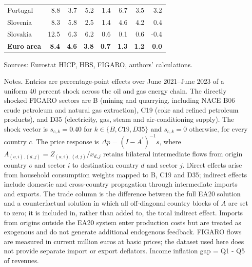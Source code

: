 \documentclass[11pt]{article}
\begin{document}
\begin{table}[H]
\begin{tabular}{lrrrrrrr}
Portugal & 8.8 & 3.7 & 5.2 & 1.4 & 6.7 & 3.5 & 3.2
 \\
Slovenia & 8.3 & 5.8 & 2.5 & 1.4 & 4.6 & 4.2 & 0.4
 \\
Slovakia & 12.5 & 6.3 & 6.2 & 0.6 & 0.1 & 0.6 & -0.4
 \\
\midrule
\textbf{Euro area} & \textbf{8.4} & \textbf{4.6} & \textbf{3.8} & \textbf{0.7} & \textbf{1.3} & \textbf{1.2} & \textbf{0.0}
 \\
\bottomrule
\end{tabular}
\par\vspace{0.35em}\footnotesize\noindent Sources: Eurostat HICP, HBS, FIGARO, authors' calculations.
\par\vspace{0.25em}\footnotesize\noindent Notes. Entries are percentage-point effects over June 2021--June 2023 of a uniform 40 percent shock across the oil and gas energy chain. The directly shocked FIGARO sectors are B (mining and quarrying, including NACE B06 crude petroleum and natural gas extraction), C19 (coke and refined petroleum products), and D35 (electricity, gas, steam and air-conditioning supply). The shock vector is $s_{c,k}=0.40$ for $k\in\{B,C19,D35\}$ and $s_{c,k}=0$ otherwise, for every country $c$. The price response is $\Delta p = (I - A^{\prime})^{-1}s$, where $A_{(o,i),(d,j)}=Z_{(o,i),(d,j)}/x_{d,j}$ retains bilateral intermediate flows from origin country $o$ and sector $i$ to destination country $d$ and sector $j$. Direct effects arise from household consumption weights mapped to B, C19 and D35; indirect effects include domestic and cross-country propagation through intermediate imports and exports. The trade column is the difference between the full EA20 solution and a counterfactual solution in which all off-diagonal country blocks of $A$ are set to zero; it is included in, rather than added to, the total indirect effect. Imports from origins outside the EA20 system enter production costs but are treated as exogenous and do not generate additional endogenous feedback. FIGARO flows are measured in current million euros at basic prices; the dataset used here does not provide separate import or export deflators. Income inflation gap = Q1 - Q5 of revenues.
\end{table}
\vspace{0.6em}
\end{document}
